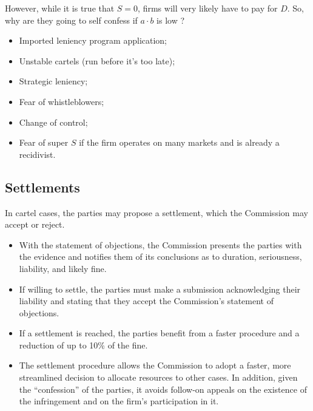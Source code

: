     However, while it is true that $S = 0$, firms will very likely have to pay for $D$. So, why are they going to self confess if \(a \cdot b\) is low ?
    \begin{itemize}
        \item Imported leniency program application;
        \item Unstable cartels (run before it’s too late); 
        \item Strategic leniency;
        \item Fear of whistleblowers;
        \item Change of control;
        \item Fear of super $S$ if the firm operates on many markets and is already a recidivist.
    \end{itemize}

    \subsection{Settlements}

    In cartel cases, the parties may propose a settlement, which the Commission may accept or reject.

    \begin{itemize}
        \item With the statement of objections, the Commission presents the parties with the evidence and notifies them of its conclusions as to duration, seriousness, liability, and likely fine.
        \item If willing to settle, the parties must make a submission acknowledging their liability and stating that they accept the Commission's statement of objections.
        \item If a settlement is reached, the parties benefit from a faster procedure and a reduction of up to 10\% of the fine.
        \item The settlement procedure allows the Commission to adopt a faster, more streamlined decision to allocate resources to other cases. In addition, given the ``confession'' of the parties, it avoids follow-on appeals on the existence of the infringement and on the firm's participation in it.
    \end{itemize}

